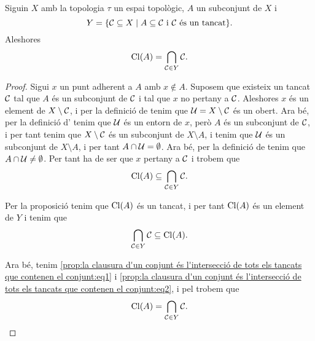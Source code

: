 \documentclass[../Apunts.tex]{subfiles}
\begin{document}
	\begin{proposition}
		\label{prop:la clausura d'un conjunt és l'intersecció de tots els tancats que contenen el conjunt}
		Siguin \(X\) amb la topologia \(\tau\) un espai topològic, \(A\) un subconjunt de \(X\) i
		\[Y=\{\mathcal{C}\subseteq X\mid A\subseteq\mathcal{C}\text{ i }\mathcal{C}\text{ és un tancat}\}.\]
		Aleshores
		\[\operatorname{Cl}(A)=\bigcap_{\mathcal{C}\in Y}\mathcal{C}.\]
		\begin{proof}
			Sigui \(x\) un punt adherent a \(A\) amb \(x\notin A\). Suposem que existeix un tancat \(\mathcal{C}\) tal que \(A\) és un subconjunt de \(\mathcal{C}\) i tal que \(x\) no pertany a \(\mathcal{C}\). Aleshores \(x\) és un element de \(X\setminus\mathcal{C}\), i per la definició de  tenim que \(\mathcal{U}=X\setminus\mathcal{C}\) és un obert. Ara bé, per la definició d' tenim que \(\mathcal{U}\) és un entorn de \(x\), però \(A\) és un subconjunt de \(\mathcal{C}\), i per tant tenim que \(X\setminus\mathcal{C}\) és un subconjunt de \(X\setminus A\), i tenim que \(\mathcal{U}\) és un subconjunt de \(X\setminus A\), i per tant \(A\cap\mathcal{U}=\emptyset\). Ara bé, per la definició de  tenim que \(A\cap\mathcal{U}\neq\emptyset\). Per tant ha de ser que \(x\) pertany a \(\mathcal{C}\) i trobem que
			\begin{equation}
				\label{prop:la clausura d'un conjunt és l'intersecció de tots els tancats que contenen el conjunt:eq1}
				\operatorname{Cl}(A)\subseteq\bigcap_{\mathcal{C}\in Y}\mathcal{C}.
			\end{equation}
			
			Per la proposició  tenim que \(\operatorname{Cl}(A)\) és un tancat, i per tant \(\operatorname{Cl}(A)\) és un element de \(Y\) i tenim que
			\begin{equation}
				\label{prop:la clausura d'un conjunt és l'intersecció de tots els tancats que contenen el conjunt:eq2}
				\bigcap_{\mathcal{C}\in Y}\mathcal{C}\subseteq\operatorname{Cl}(A).
			\end{equation}
			
			Ara bé, tenim \eqref{prop:la clausura d'un conjunt és l'intersecció de tots els tancats que contenen el conjunt:eq1} i \eqref{prop:la clausura d'un conjunt és l'intersecció de tots els tancats que contenen el conjunt:eq2}, i pel  trobem que
			\[\operatorname{Cl}(A)=\bigcap_{\mathcal{C}\in Y}\mathcal{C}.\qedhere\]
		\end{proof}
	\end{proposition}
\end{document}
